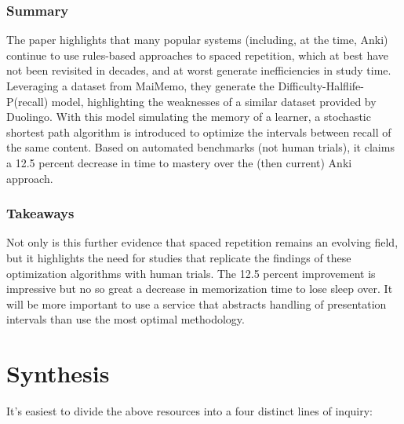 \documentclass[
	letterpaper, %
]{jdf}
\begin{document}
\subsubsection{Summary}
The paper highlights that many popular systems (including, at the time, Anki) continue to use rules-based approaches to spaced repetition, which at best have not been revisited in decades, and at worst generate inefficiencies in study time. Leveraging a dataset from MaiMemo, they generate the Difficulty-Halflife-P(recall) model, highlighting the weaknesses of a similar dataset provided by Duolingo. With this model simulating the memory of a learner, a stochastic shortest path algorithm is introduced to optimize the intervals between recall of the same content. Based on automated benchmarks (not human trials), it claims a 12.5 percent decrease in time to mastery over the (then current) Anki approach.

\subsubsection{Takeaways}
Not only is this further evidence that spaced repetition remains an evolving field, but it highlights the need for studies that replicate the findings of these optimization algorithms with human trials. The 12.5 percent improvement is impressive but no so great a decrease in memorization time to lose sleep over. It will be more important to use a service that abstracts handling of presentation intervals than use the most optimal methodology.

\section{Synthesis}

It's easiest to divide the above resources into a four distinct lines of inquiry:
\end{document}
